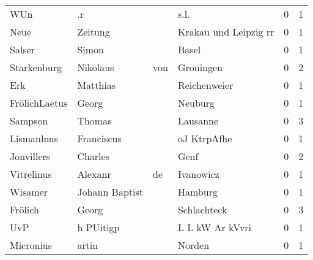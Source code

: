 \begin{center}
\begin{tiny}
\begin{longtabu}{llllrr}
                      WUn &                                 .r &             &                                        s.l. &          0 &         1 \\
                     Neue &                            Zeitung &             &                       Krakau und Leipzig rr &          0 &         1 \\
                   Salser &                              Simon &             &                                       Basel &          0 &         1 \\
              Starkenburg &                           Nikolaus &         von &                                   Groningen &          0 &         2 \\
                      Erk &                           Matthias &             &                                Reichenweier &          0 &         1 \\
            FrölichLaetus &                              Georg &             &                                     Neuburg &          0 &         1 \\
                  Sampson &                             Thomas &             &                                    Lausanne &          0 &         3 \\
               Lismanlnus &                         Franciscus &             &                                 oJ KtrpAfhe &          0 &         1 \\
               Jonvillers &                            Charles &             &                                        Genf &          0 &         2 \\
               Vitrelinus &                            Alexanr &          de &                                   Ivanowicz &          0 &         1 \\
                  Wisamer &                     Johann Baptist &             &                                     Hamburg &          0 &         1 \\
                  Frölich &                              Georg &             &                                 Schlachteck &          0 &         3 \\
                      UvP &                          h PUitigp &             &                             L L kW Ar kVvri &          0 &         1 \\
                Micronius &                              artin &             &                                      Norden &          0 &         1 \\

\end{longtabu}
\end{tiny}
\end{center}
